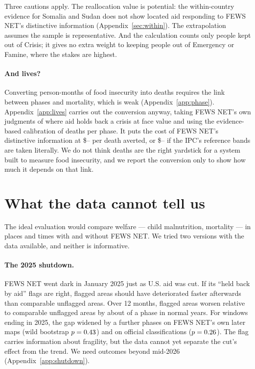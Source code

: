 \documentclass[11pt]{article}
\begin{document}
Three cautions apply. The reallocation value is potential: the within-country evidence for Somalia and Sudan does not show located aid responding to FEWS NET's distinctive information (Appendix~\ref{sec:within}). The extrapolation assumes the sample is representative. And the calculation counts only people kept out of Crisis; it gives no extra weight to keeping people out of Emergency or Famine, where the stakes are highest.

\paragraph{And lives?} Converting person-months of food insecurity into deaths requires the link between phases and mortality, which is weak (Appendix~\ref{app:phase}). Appendix~\ref{app:lives} carries out the conversion anyway, taking FEWS NET's own judgments of where aid holds back a crisis at face value and using the evidence-based calibration of deaths per phase. It puts the cost of FEWS NET's distinctive information at \$\bcDistinctLo{}--\bcDistinctHi{} per death averted, or \$\ipcDistinctLo{}--\ipcDistinctHi{} if the IPC's reference bands are taken literally. We do not think deaths are the right yardstick for a system built to measure food insecurity, and we report the conversion only to show how much it depends on that link.

\FloatBarrier
\section{What the data cannot tell us}\label{sec:limits}\label{sec:limits2}

The ideal evaluation would compare welfare --- child malnutrition, mortality --- in places and times with and without FEWS NET. We tried two versions with the data available, and neither is informative.

\paragraph{The 2025 shutdown.} FEWS NET went dark in January 2025 just as U.S. aid was cut. If its ``held back by aid'' flags are right, flagged areas should have deteriorated faster afterwards than comparable unflagged areas. Over 12 months, flagged areas worsen relative to comparable unflagged areas by about \flagOwnPlacebo{} of a phase in normal years. For windows ending in 2025, the gap widened by a further \flagOwn{} phases on FEWS NET's own later maps (wild bootstrap $p = 0.43{}$) and \flagIpc{} on official classifications ($p = 0.26{}$). The flag carries information about fragility, but the data cannot yet separate the cut's effect from the trend. We need outcomes beyond mid-2026 (Appendix~\ref{app:shutdown}).
\end{document}
